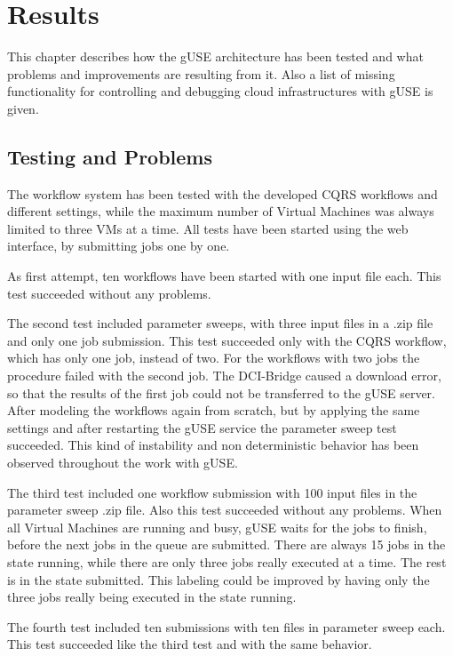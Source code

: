 \section{Results}\label{results}

This chapter describes how the gUSE architecture has been tested and what problems and improvements are resulting from it.
Also a list of missing functionality for controlling and debugging cloud infrastructures with gUSE is given.

\subsection{Testing and Problems}\label{testing}

The workflow system has been tested with the developed CQRS workflows and different settings, while the maximum number of Virtual Machines was always limited to three VMs at a time.
All tests have been started using the web interface, by submitting jobs one by one.

As first attempt, ten workflows have been started with one input file each.
This test succeeded without any problems.

The second test included parameter sweeps, with three input files in a .zip file and only one job submission.
This test succeeded only with the CQRS workflow, which has only one job, instead of two.
For the workflows with two jobs the procedure failed with the second job.
The DCI-Bridge caused a download error, so that the results of the first job could not be transferred to the gUSE server.
After modeling the workflows again from scratch, but by applying the same settings and after restarting the gUSE service the parameter sweep test succeeded.
This kind of instability and non deterministic behavior has been observed throughout the work with gUSE.

The third test included one workflow submission with 100 input files in the parameter sweep .zip file.
Also this test succeeded without any problems.
When all Virtual Machines are running and busy, gUSE waits for the jobs to finish, before the next jobs in the queue are submitted.
There are always 15 jobs in the state running, while there are only three jobs really executed at a time.
The rest is in the state submitted.
This labeling could be improved by having only the three jobs really being executed in the state running.

The fourth test included ten submissions with ten files in parameter sweep each.
This test succeeded like the third test and with the same behavior.


